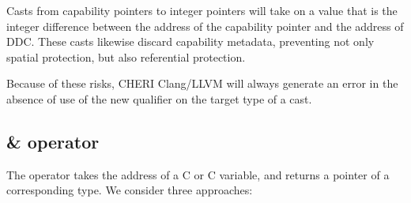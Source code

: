 \documentclass[12pt,twoside,openright,a4paper]{article}
\newcommand{\ccode}[1]{{\small\ttfamily{#1}}}
\newcommand{\note}[2]{{\color{blue}[ Note: #1 - #2]}}
\renewcommand{\note}[2]{\relax\ifhmode\unskip\fi}
\newcommand{\bdnote}[1]{\note{#1}{Brooks D.}}
\newcommand{\rwnote}[1]{\note{#1}{Robert W.}}
\newcommand{\dcnote}[1]{\note{#1}{David}}
\newcommand*{\cpp}{\texorpdfstring{C\textsmaller[2]{\protect\nolinebreak[4]\hspace{-.05em}\raisebox{.45ex}{\textbf{++}}}}{C++}}
\begin{document}
Casts from capability pointers to integer pointers will take on a value that
is the integer difference between the address of the capability pointer and
the address of DDC.
These casts likewise discard capability metadata, preventing not only spatial
protection, but also referential protection.

Because of these risks, CHERI Clang/LLVM will always generate an error in
the absence of use of the new \ccode{\_\_cheri\_fromcap} qualifier on the
target type of a cast.

\rwnote{Say something about the associated built-ins?}

\rwnote{Give examples of warnings?}

\dcnote{We used to have instructions for this.  The goal for systems without
that was cap -> int pointer casts would do a CTestSubset, CSub, CCMOV sequence,
so casting from a not-in-DDC cap to an integer pointer would give either a
valid pointer or null.  The programmer invariant is that either the resulting
pointer can be used to access the entire object, or it is a detectable null.
The LLVM IR language reference now include this guarantee for address space
casts.}

\bdnote{In the CheriBSD kernel \ccode{\_\_cheri\_fromcap} is commonly used
for kernel-addresses that happen to be stored in capabilities,
but probably should be replaced by a macro that ensures that this is true
on systems where DDC includes userspace addresses (all of them today).}

\subsection{\& operator}

The \ccode{\&} operator takes the address of a C or \cpp{} variable, and
returns a pointer of a corresponding type.
We consider three approaches:
\end{document}
